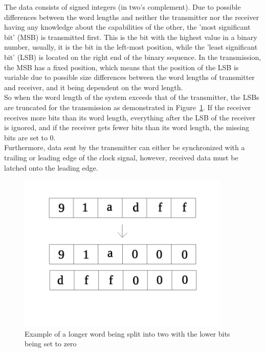 The data consists of signed integers (in two's complement).
Due to possible differences between the word lengths and neither the transmitter nor the
receiver having any knowledge about the capabilities of the other, the 'most significant bit' (MSB) is transmitted first.
This is the bit with the highest value in a binary number, usually, it is the bit in the left-most position,
while the 'least significant bit' (LSB) is located on the right end of the binary sequence.
In the transmission, the MSB has a fixed position, which means that the position of the LSB
is variable due to possible size differences between the word lengths of transmitter and receiver,
and it being dependent on the word length.\\
So when the word length of the system exceeds that of the transmitter, the LSBs are truncated
for the transmission as demonstrated in Figure~\ref{fig:truncation}.
If the receiver receives more bits than its word length, everything after the LSB
of the receiver is ignored, and if the receiver gets fewer bits than its word length,
the missing bits are set to 0.\\
Furthermore, data sent by the transmitter can either be synchronized with a trailing or leading edge
of the clock signal, however, received data must be latched onto the leading edge.


\begin{figure}[htb]
    \centering
    \includegraphics[width=0.9\textwidth]{figures/fundamentals_truncation.png}
    \caption[Illustration: Truncation of words]{Example of a longer word being split into two with the lower bits being set to zero}
    \label{fig:truncation}
\end{figure}

